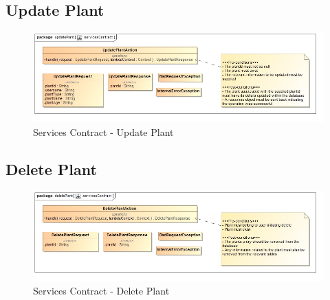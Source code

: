 \documentclass{article}
\begin{document}
	\subsection{Update Plant}
		\begin{figure}[H]
			\includegraphics[width=\linewidth]{../images/ServicesContracts/updatePlant.jpg}
			\caption{Services Contract - Update Plant}
		\end{figure}
		
	\subsection{Delete Plant}
		\begin{figure}[H]
			\includegraphics[width=\linewidth]{../images/ServicesContracts/deletePlant.jpg}
			\caption{Services Contract - Delete Plant}
		\end{figure}
\end{document}
